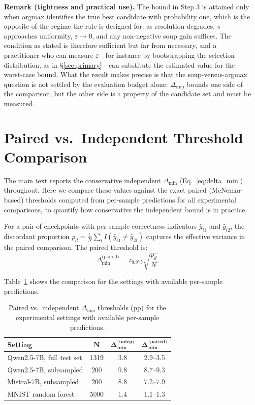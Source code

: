 \documentclass[pdflatex,sn-mathphys-ay,oneside]{sn-jnl}
\theoremstyle{thmstylethree}
\begin{document}
\medskip
\noindent\textbf{Remark (tightness and practical use).} The bound in Step 3 is attained only when argmax identifies the true best candidate with probability one, which is the opposite of the regime the rule is designed for: as resolution degrades, $\pi$ approaches uniformity, $\varepsilon \to 0$, and any non-negative soup gain suffices. The condition as stated is therefore sufficient but far from necessary, and a practitioner who can measure $\varepsilon$---for instance by bootstrapping the selection distribution, as in \S\ref{sec:primary}---can substitute the estimated value for the worst-case bound. What the result makes precise is that the soup-versus-argmax question is not settled by the evaluation budget alone: $\Delta_{\min}$ bounds one side of the comparison, but the other side is a property of the candidate set and must be measured.

\section{Paired vs.\ Independent Threshold Comparison}\label{app:paired}

The main text reports the conservative independent $\Delta_{\min}$ (Eq.~\eqref{eq:delta_min}) throughout. Here we compare these values against the exact paired (McNemar-based) thresholds computed from per-sample predictions for all experimental comparisons, to quantify how conservative the independent bound is in practice.

For a pair of checkpoints with per-sample correctness indicators $\hat y_{i1}$ and $\hat y_{i2}$, the discordant proportion $p_d = \frac{1}{N}\sum_i I(\hat y_{i1} \neq \hat y_{i2})$ captures the effective variance in the paired comparison. The paired threshold is:
\[
\Delta_{\min}^{\text{(paired)}} = z_{0.975} \sqrt{\frac{p_d}{N}}.
\]

Table~\ref{tab:paired_vs_indep} shows the comparison for the settings with available per-sample predictions.

\begin{table}[h]
\centering
\caption{Paired vs.\ independent $\Delta_{\min}$ thresholds (pp) for the experimental settings with available per-sample predictions.}
\label{tab:paired_vs_indep}
\begin{tabular}{lccc}\toprule
\textbf{Setting} & $\bm{N}$ & $\bm{\Delta_{\min}^{\text{(indep)}}}$ & $\bm{\Delta_{\min}^{\text{(paired)}}}$ \\\midrule
Qwen2.5-7B, full test set & 1319 & 3.8 & 2.9--3.5 \\
Qwen2.5-7B, subsampled & 200 & 9.8 & 8.7--9.3 \\
Mistral-7B, subsampled & 200 & 8.8 & 7.2--7.9 \\
MNIST random forest & 5000 & 1.4 & 1.1--1.3 \\
\bottomrule
\end{tabular}
\end{table}
\end{document}
